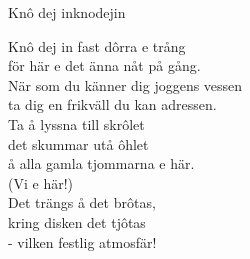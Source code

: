 \begin{song}{Knô dej in}{knodejin}
\begin{vers}
Knô dej in fast dôrra e trång\\
för här e det änna nåt på gång.\\
När som du känner dig joggens vessen\\
ta dig en frikväll du kan adressen.\\
Ta å lyssna till skrôlet\\
det skummar utå ôhlet\\
å alla gamla tjommarna e här.\\
(Vi e här!)\\
Det trängs å det brôtas,\\
kring disken det tjôtas\\
- vilken festlig atmosfär!\\
\end{vers}
\end{song}
